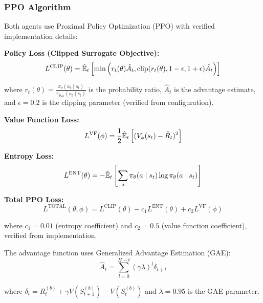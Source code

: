 \documentclass[12pt,twoside]{article}
\begin{document}
\subsubsection{PPO Algorithm}

Both agents use Proximal Policy Optimization (PPO) with verified implementation details:

\textbf{Policy Loss (Clipped Surrogate Objective):}
\begin{equation}
L^{\text{CLIP}}(\theta) = \hat{\mathbb{E}}_t\left[\min\left(r_t(\theta)\hat{A}_t, \text{clip}(r_t(\theta), 1-\epsilon, 1+\epsilon)\hat{A}_t\right)\right]
\end{equation}

where $r_t(\theta) = \frac{\pi_\theta(a_t \mid s_t)}{\pi_{\theta_{\text{old}}}(a_t \mid s_t)}$ is the probability ratio, $\hat{A}_t$ is the advantage estimate, and $\epsilon = 0.2$ is the clipping parameter (verified from configuration).

\textbf{Value Function Loss:}
\begin{equation}
L^{\text{VF}}(\phi) = \frac{1}{2}\hat{\mathbb{E}}_t\left[(V_\phi(s_t) - \hat{R}_t)^2\right]
\end{equation}

\textbf{Entropy Loss:}
\begin{equation}
L^{\text{ENT}}(\theta) = -\hat{\mathbb{E}}_t\left[\sum_a \pi_\theta(a \mid s_t) \log \pi_\theta(a \mid s_t)\right]
\end{equation}

\textbf{Total PPO Loss:}
\begin{equation}
L^{\text{TOTAL}}(\theta, \phi) = L^{\text{CLIP}}(\theta) - c_1 L^{\text{ENT}}(\theta) + c_2 L^{\text{VF}}(\phi)
\end{equation}

where $c_1 = 0.01$ (entropy coefficient) and $c_2 = 0.5$ (value function coefficient), verified from implementation.

The advantage function uses Generalized Advantage Estimation (GAE):
\begin{equation}
\hat{A}_t = \sum_{l=0}^{H-t} (\gamma \lambda)^l \delta_{t+l}
\end{equation}

where $\delta_t = R_t^{(b)} + \gamma V(S_{t+1}^{(b)}) - V(S_t^{(b)})$ and $\lambda = 0.95$ is the GAE parameter.
\end{document}
